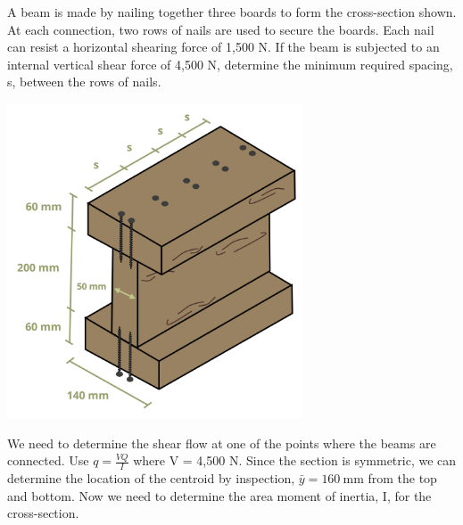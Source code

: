 \documentclass[
  letterpaper,
  DIV=11,
  numbers=noendperiod]{scrreprt}
\theoremstyle{definition}
\theoremstyle{remark}
\begin{document}
\begin{tcolorbox}[enhanced jigsaw, leftrule=.75mm, colbacktitle=quarto-callout-tip-color!10!white, breakable, opacityback=0, colback=white, titlerule=0mm, toprule=.15mm, colframe=quarto-callout-tip-color-frame, coltitle=black, title={Example 10.5}, toptitle=1mm, bottomrule=.15mm, rightrule=.15mm, left=2mm, arc=.35mm, opacitybacktitle=0.6, bottomtitle=1mm]

A beam is made by nailing together three boards to form the
cross-section shown. At each connection, two rows of nails are used to
secure the boards. Each nail can resist a horizontal shearing force of
1,500 N. If the beam is subjected to an internal vertical shear force of
4,500 N, determine the minimum required spacing, s, between the rows of
nails.

\begin{center}
\includegraphics[width=3.44792in,height=\textheight]{images/CH10 PNGs/example 10.5 part 1.png}
\end{center}

\begin{tcolorbox}[enhanced jigsaw, leftrule=.75mm, colbacktitle=quarto-callout-tip-color!10!white, breakable, opacityback=0, colback=white, titlerule=0mm, toprule=.15mm, colframe=quarto-callout-tip-color-frame, coltitle=black, title={Solution}, toptitle=1mm, bottomrule=.15mm, rightrule=.15mm, left=2mm, arc=.35mm, opacitybacktitle=0.6, bottomtitle=1mm]

We need to determine the shear flow at one of the points where the beams
are connected. Use \(q=\frac{V Q}{I}\) where V = 4,500 N. Since the
section is symmetric, we can determine the location of the centroid by
inspection, \(\bar{y}=160 \mathrm{~mm}\) from the top and bottom. Now we
need to determine the area moment of inertia, I, for the cross-section.


\end{tcolorbox}
\end{tcolorbox}
\end{document}
